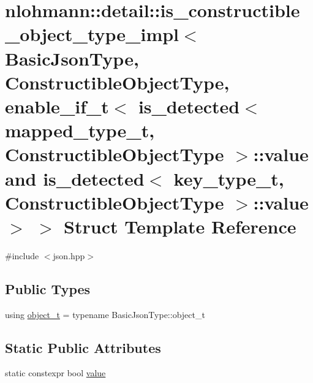 \hypertarget{structnlohmann_1_1detail_1_1is__constructible__object__type__impl_3_01_basic_json_type_00_01_con6e3270de8050717120afcafe87648413}{}\section{nlohmann\+::detail\+::is\+\_\+constructible\+\_\+object\+\_\+type\+\_\+impl$<$ Basic\+Json\+Type, Constructible\+Object\+Type, enable\+\_\+if\+\_\+t$<$ is\+\_\+detected$<$ mapped\+\_\+type\+\_\+t, Constructible\+Object\+Type $>$\+::value and is\+\_\+detected$<$ key\+\_\+type\+\_\+t, Constructible\+Object\+Type $>$\+::value $>$ $>$ Struct Template Reference}
\label{structnlohmann_1_1detail_1_1is__constructible__object__type__impl_3_01_basic_json_type_00_01_con6e3270de8050717120afcafe87648413}


{\ttfamily \#include $<$json.\+hpp$>$}

\subsection*{Public Types}
\begin{DoxyCompactItemize}
\item 
using \mbox{\hyperlink{structnlohmann_1_1detail_1_1is__constructible__object__type__impl_3_01_basic_json_type_00_01_con6e3270de8050717120afcafe87648413_a6f458a63276ef62d60f4b93de03aa020}{object\+\_\+t}} = typename Basic\+Json\+Type\+::object\+\_\+t
\end{DoxyCompactItemize}
\subsection*{Static Public Attributes}
\begin{DoxyCompactItemize}
\item 
static constexpr bool \mbox{\hyperlink{structnlohmann_1_1detail_1_1is__constructible__object__type__impl_3_01_basic_json_type_00_01_con6e3270de8050717120afcafe87648413_a7c1801a302b938e3176435b6451962e4}{value}}
\end{DoxyCompactItemize}


